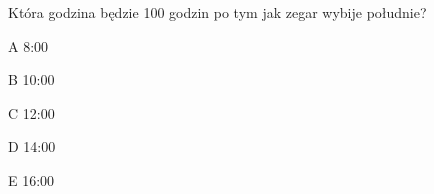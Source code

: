 \begin{tresc}
Która godzina będzie 100 godzin po tym jak zegar wybije południe?
\end{tresc}
\begin{wariant}{A} 8:00 \end{wariant}
\begin{wariant}{B} 10:00 \end{wariant}
\begin{wariant}{C} 12:00 \end{wariant}
\begin{wariant}{D} 14:00 \end{wariant}
\begin{wariant}{E} 16:00 \end{wariant}
